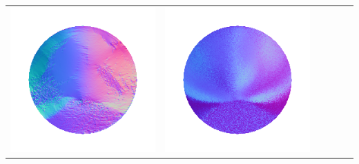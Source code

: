 \begin{tabularx}{\linewidth}{@{}Y@{}Y@{}Y@{}Y@{}Y@{}Y@{}}
\includegraphics[width=\linewidth]{semisynthetic/20160617_13_yu_out.png} &
\includegraphics[width=\linewidth]{semisynthetic/20160617_13_dpsn_out.png} &

\end{tabularx}
